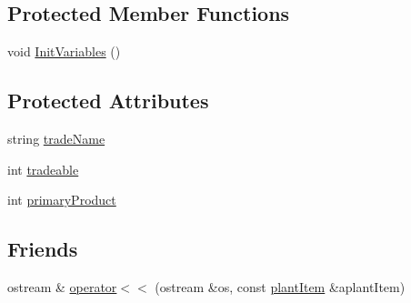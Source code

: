 \subsection*{Protected Member Functions}
\begin{DoxyCompactItemize}
\item 
void \hyperlink{classplant_item_a68b971164b0ea870d6d14c5b53ad8223}{InitVariables} ()
\end{DoxyCompactItemize}
\subsection*{Protected Attributes}
\begin{DoxyCompactItemize}
\item 
string \hyperlink{classplant_item_a8591ebca83e9a76f496ed8fdb70dd36c}{tradeName}
\item 
int \hyperlink{classplant_item_ad5daab88f181729c18eb9141d819ed69}{tradeable}
\item 
int \hyperlink{classplant_item_af54e9c26d0a6b3c7a4f899dd591634c0}{primaryProduct}
\end{DoxyCompactItemize}
\subsection*{Friends}
\begin{DoxyCompactItemize}
\item 
ostream \& \hyperlink{classplant_item_a57bdf6a52f37049686a779f3c93ecc73}{operator$<$$<$} (ostream \&os, const \hyperlink{classplant_item}{plantItem} \&aplantItem)
\end{DoxyCompactItemize}


